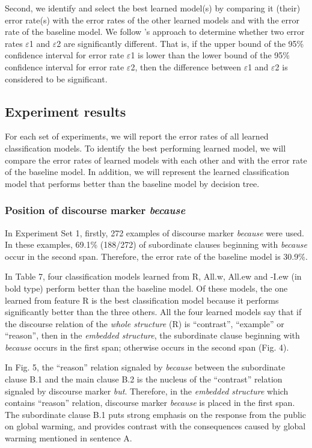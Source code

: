 \documentclass[english]{jnlp_1.3e}
\begin{document}
Second, we identify and select the best learned model(s) by 
comparing it (their) error rate(s) with the error rates of the 
other learned models and with the error rate of the baseline model. 
We follow \cite{Eugenio97}'s approach to 
determine whether two error rates $\varepsilon$1 and $\varepsilon$2 
are significantly different. That is, if the upper bound of the 
95\% confidence interval for error rate $\varepsilon$1 is lower 
than the lower bound of the 95\% confidence interval for error rate 
$\varepsilon$2, then the difference between $\varepsilon$1 and $\varepsilon$2 is
considered to be significant. 

\subsection{Experiment results}

For each set of experiments, we will report the error rates of all learned
classification models. To identify the best performing learned model, we will
compare the error rates of learned models with each other and with the error rate of
the baseline model. In addition, we will represent the learned classification model
that performs better than the baseline model by decision tree. 
 
\subsubsection{Position of discourse marker \textit{because}}

In Experiment Set 1, firstly, 272 examples of discourse marker 
\textit{because} were used. In these examples, 69.1\% (188/272) of 
subordinate clauses beginning with \textit{because} occur in the second span. 
Therefore, the error rate of the baseline model is 30.9\%. 

In Table 7, four classification models learned from R, All.w, All.ew 
and -I.ew (in bold type) perform better than the baseline model. 
Of these models, the one learned from feature R is the best classification
model because it performs significantly better than the three others. 
All the four learned models say that if the discourse relation 
of the \textit{whole structure} (R) is ``contrast'', ``example'' or 
``reason'', then in the \textit{embedded structure}, the subordinate 
clause beginning with \textit{because} occurs in the first span; 
otherwise occurs in the second span (Fig. 4).

In Fig. 5, the ``reason'' relation signaled by \textit{because} 
between the subordinate clause B.1 and the main clause B.2 
is the nucleus of the ``contrast'' relation signaled by discourse 
marker \textit{but}. Therefore, in the \textit{embedded structure}
which contains ``reason'' relation, discourse marker \textit{because} is 
placed in the first span. The subordinate 
clause B.1 puts strong emphasis on the response from the 
public on global warming, and provides contrast with the consequences 
caused by global warming mentioned in sentence A. 
\end{document}
